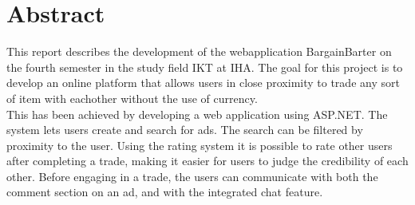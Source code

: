 \section{Abstract}
This report describes the development of the webapplication BargainBarter on the fourth semester in the study field IKT at IHA. The goal for this project is to develop an online platform that allows users in close proximity to trade any sort of item with eachother without the use of currency. 
\\This has been achieved by developing a web application using ASP.NET. The system lets users create and search for ads. The search can be filtered by proximity to the user. Using the rating system it is possible to rate other users after completing a trade, making it easier for users to judge the credibility of each other. Before engaging in a trade, the users can communicate with both the comment section on an ad, and with the integrated chat feature.




